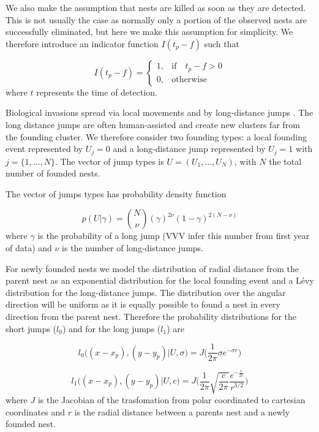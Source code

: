 \documentclass{article}
\begin{document}
We also make the assumption that nests are killed as soon as they are detected. This is not usually the case as normally only a portion of the observed nests are successfully eliminated, but here we make this assumption for simplicity. We therefore introduce an indicator function $I(t_p - f)$ such that

\begin{equation*}
    I (t_p - f) =
    \begin{cases}
        1, & \mbox{if} \quad t_p -  f > 0 \\
        0, & \mbox{otherwise}
    \end{cases}
\end{equation*}
where $t$ represents the time of detection.

Biological invasions spread via local movements and by long-distance jumps \cite{Suarez}. The long distance jumps are often human-assisted and create new clusters far from the founding cluster. We therefore consider two founding types: a local founding event represented by $U_j = 0$ and a long-distance jump represented by $U_j = 1$ with $j = \{1, \dots, N\}$. The vector of jump types is $U = (U_1, \dots, U_N)$, with $N$ the total number of founded nests.

The vector of jumps types has probability density function

\begin{equation*}
    p(U| \gamma ) = {N \choose \nu}(\gamma)^{2\nu}(1 - \gamma)^{2(N - \nu)}
\end{equation*}
where $\gamma$ is the probability of a long jump (VVV infer this number from first year of data) and $\nu$ is the number of long-distance jumps.

For newly founded nests we model the distribution of radial distance from the parent nest as an exponential distribution for the local founding event and a L\'evy distribution for the long-distance jumps. The distribution over the angular direction will be uniform as it is equally possible to found a nest in every direction from the parent nest. Therefore the probability distributions for the short jumps ($l_0$) and for the long jumps ($l_1$) are

\begin{equation*}
    l_0\Big((x - x_p), (y - y_p) | U, \sigma \Big)= J \bigg(\frac{1}{2 \pi} \sigma e^{- \sigma r}\bigg)
\end{equation*}

\begin{equation*}
    l_1\Big((x - x_p), (y - y_p) | U, c \Big)= J \bigg(\frac{1}{2 \pi} \sqrt{\frac{c}{2 \pi}} \frac{e^{- \frac{c}{ 2 r}}}{r^{3/2}}\bigg)
\end{equation*}
where $J$ is the Jacobian of the trasfomation from polar coordinated to cartesian coordinates and $r$ is the radial distance between a parents nest and a newly founded nest.
\end{document}
